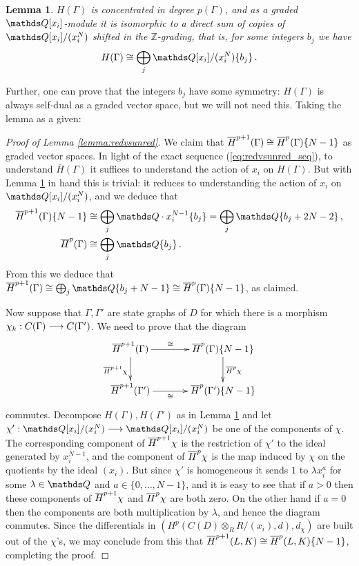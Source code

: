 \documentclass{compositio}
\newtheorem{lemma}[theorem]{Lemma}
\theoremstyle{definition}
\numberwithin{equation}{section}
\begin{document}
\begin{lemma}\label{lemma:directsumalgebras} $H(\Gamma)$ is concentrated in degree $p(\Gamma)$, and as a graded $\QQ[x_i]$-module it is isomorphic to a direct sum of copies of $\QQ[x_i]/(x_i^N)$ shifted in the $\mathds{Z}$-grading, that is, for some integers $b_j$ we have
\[
H(\Gamma) \cong \bigoplus_{j} \QQ[x_i]/(x_i^N)\{b_j\} \, .
\]
\end{lemma}

Further, one can prove that the integers $b_j$ have some symmetry: $H(\Gamma)$ is always self-dual as a graded vector space, but we will not need this. Taking the lemma as a given:

\begin{proof}[Proof of Lemma \ref{lemma:redvsunred}] We claim that $\overline{H}^{p+1}(\Gamma) \cong \overline{H}^p(\Gamma)\{N-1\}$ as graded vector spaces. In light of the exact sequence (\ref{eq:redvsunred_seq}), to understand $\overline{H}(\Gamma)$ it suffices to understand the action of $x_i$ on $H(\Gamma)$. But with Lemma \ref{lemma:directsumalgebras} in hand this is trivial: it reduces to understanding the action of $x_i$ on $\QQ[x_i]/(x_i^N)$, and we deduce that
\begin{align*}
\redh^{p+1}(\Gamma)\{N-1\} &\cong \bigoplus_j \QQ \cdot x_i^{N-1} \{ b_j \} = \bigoplus_j \QQ\{b_j + 2N - 2 \} \, ,\\
\redh^p(\Gamma) &\cong \bigoplus_j \QQ \{ b_j \}\,.
\end{align*}
From this we deduce that $\redh^{p+1}(\Gamma) \cong \bigoplus_j \QQ\{b_j + N - 1 \} \cong \redh^p(\Gamma)\{N-1\}$, as claimed.

Now suppose that $\Gamma, \Gamma'$ are state graphs of $D$ for which there is a morphism $\chi_k: C(\Gamma) \longrightarrow C(\Gamma')$. We need to prove that the diagram
\[
\xymatrix@C+1pc{
\redh^{p+1}(\Gamma) \ar[d]_{\redh^{p+1}\chi}\ar[r]^-{\cong} & \redh^p(\Gamma)\{N-1\}\ar[d]^{\redh^p \chi}\\
\redh^{p+1}(\Gamma') \ar[r]_-{\cong} & \redh^p(\Gamma')\{N-1\}
}
\]
commutes. Decompose $H(\Gamma), H(\Gamma')$ as in Lemma \ref{lemma:directsumalgebras} and let $\chi': \QQ[x_i]/(x_i^N) \lto \QQ[x_i]/(x_i^N)$ be one of the components of $\chi$. The corresponding component of $\overline{H}^{p+1} \chi$ is the restriction of $\chi'$ to the ideal generated by $x_i^{N-1}$, and the component of $\overline{H}^p \chi$ is the map induced by $\chi$ on the quotients by the ideal $(x_i)$. But since $\chi'$ is homogeneous it sends $1$ to $\lambda x_i^a$ for some $\lambda \in \QQ$ and $a \in \{0,\ldots, N - 1\}$, and it is easy to see that if $a > 0$ then these components of $\overline{H}^{p+1} \chi$ and $\overline{H}^p \chi$ are both zero. On the other hand if $a = 0$ then the components are both multiplication by $\lambda$, and hence the diagram commutes. Since the differentials in $(H^p(C(D) \otimes_R R/(x_i),d), d_\chi)$ are built out of the $\chi$'s, we may conclude from this that $\overline{H}^{p+1}(L,K) \cong \overline{H}^{p}(L,K)\{N-1\}$, completing the proof.
\end{proof}
\end{document}
